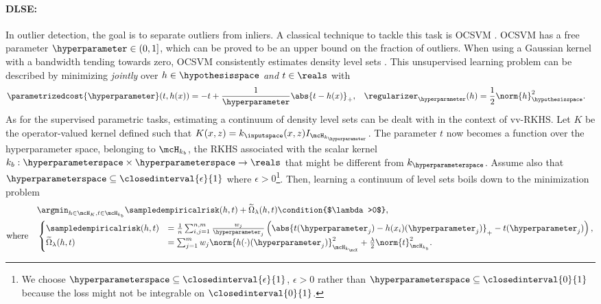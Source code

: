 \paragraph{\acl{DLSE}:} In outlier detection, the goal is to separate outliers
from inliers. A classical technique to tackle this task is \ac{OCSVM}
\citep{scholkopf2000new}. \ac{OCSVM} has a free parameter
$\hyperparameter\in(0, 1]$, which can be proved to be an upper bound on the
fraction of outliers. When using a Gaussian kernel with a bandwidth tending
towards zero, \acs{OCSVM} consistently estimates density level sets
\citep{vert2006consistency}.  This unsupervised learning problem can be
described by minimizing \emph{jointly} over $h\in\hypothesisspace$ \emph{and}
$t\in\reals$ with
\begin{align*}%
    \parametrizedcost{\hyperparameter}(t, h(x)) &= -t +
    \frac{1}{\hyperparameter}\abs{t - h(x)}_+, &
    \regularizer_{\hyperparameter}(h) &=
    \frac{1}{2}\norm{h}^2_{\hypothesisspace}.
\end{align*}
%
As for the supervised parametric tasks, estimating a continuum of density level
sets can be dealt with in the context of \acl{vv-RKHS}. Let $K$ be the
operator-valued kernel defined such that $K(x,z)=k_{\inputspace}(x,z)
I_{\mcH_{k_{\hyperparameter}}}$.  The parameter $t$ now becomes a function over
the hyperparameter space, belonging to $\mcH_{k_{b}}$, the \ac{RKHS} associated
with the scalar kernel $k_{b}:\hyperparameterspace \times \hyperparameterspace
\rightarrow \reals$ that might be different from $k_{\hyperparameterspace}$.
Assume also that $\hyperparameterspace \subseteq \closedinterval{\epsilon}{1}$
where $\epsilon > 0$\footnote{We choose $\hyperparameterspace \subseteq
\closedinterval{\epsilon}{1}$, $\epsilon > 0$ rather than
$\hyperparameterspace\subseteq\closedinterval{0}{1}$ because the loss might not
be integrable on $\closedinterval{0}{1}$.}. Then, learning a
continuum of level sets boils down to the minimization problem
\begin{align}\label{problem:ocsvm}
    &\argmin_{h \in \mcH_K, t \in \mcH_{k_{b}}} \sampledempiricalrisk(h,t) +
    \widetilde{\Omega}_{\lambda}(h,t) \condition{$\lambda >0$},\\
\text{where} \quad &
\begin{cases} \nonumber
  \sampledempiricalrisk(h,t) &= \frac{1}{n}
  \sum_{i, j=1}^{n, m} \frac{w_j}{\hyperparameter_j} \left(
  \abs{t(\hyperparameter_j) - h(x_i)(\hyperparameter_j)}_+ -
  t(\hyperparameter_j)\right),  \\
  \widetilde{\Omega}_{\lambda}(h,t)
  &=  \sum_{j=1}^m w_j
  \norm{h(\cdot)(\hyperparameter_j)}_{\mcH_{k_{\mcX}}}^2  + \frac{\lambda}{2}
  \norm{t}_{\mcH_{k_{b}}}^2.
\end{cases}
\end{align}
